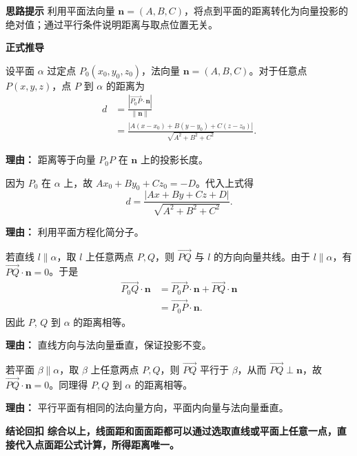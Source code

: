\begin{proofbox}
	\textbf{\textcolor{CProof}{思路提示}}
	利用平面法向量 $\mathbf{n}=(A,B,C)$，将点到平面的距离转化为向量投影的绝对值；通过平行条件说明距离与取点位置无关。

	\medskip
	\textbf{\textcolor{CProof}{正式推导}}
	\begin{description}[style=nextline, leftmargin=2.8em, labelsep=0.5em, itemsep=0.55em]
		\item[\textbf{步骤一（点面距公式推导）：}]
			设平面 $\alpha$ 过定点 $P_0(x_0,y_0,z_0)$，法向量 $\mathbf{n}=(A,B,C)$。对于任意点 $P(x,y,z)$，点 $P$ 到 $\alpha$ 的距离为
			\[
				\begin{aligned}
					d &= \frac{|\overrightarrow{P_0P}\cdot\mathbf{n}|}{\|\mathbf{n}\|} \\ &= \frac{|A(x-x_0)+B(y-y_0)+C(z-z_0)|}{\sqrt{A^2+B^2+C^2}}.
			\end{aligned}
			\]
			\par\textbf{理由：} 距离等于向量 $P_0P$ 在 $\mathbf{n}$ 上的投影长度。
		\item[\textbf{步骤二（代入平面方程）：}]
			因为 $P_0$ 在 $\alpha$ 上，故 $Ax_0+By_0+Cz_0=-D$。代入上式得
			\[
				d = \frac{|Ax+By+Cz+D|}{\sqrt{A^2+B^2+C^2}}.
			\]
			\par\textbf{理由：} 利用平面方程化简分子。
		\item[\textbf{步骤三（线面平行距离不变）：}]
			若直线 $l\parallel\alpha$，取 $l$ 上任意两点 $P,Q$，则 $\overrightarrow{PQ}$ 与 $l$ 的方向向量共线。由于 $l\parallel\alpha$，有 $\overrightarrow{PQ}\cdot\mathbf{n}=0$。于是
			\[
				\begin{aligned}
					\overrightarrow{P_0Q}\cdot\mathbf{n} &= \overrightarrow{P_0P}\cdot\mathbf{n} + \overrightarrow{PQ}\cdot\mathbf{n} \\ &= \overrightarrow{P_0P}\cdot\mathbf{n}.
			\end{aligned}
			\]
			因此 $P$, $Q$ 到 $\alpha$ 的距离相等。
			\par\textbf{理由：} 直线方向与法向量垂直，保证投影不变。
		\item[\textbf{步骤四（面面平行距离不变）：}]
			若平面 $\beta\parallel\alpha$，取 $\beta$ 上任意两点 $P,Q$，则 $\overrightarrow{PQ}$ 平行于 $\beta$，从而 $\overrightarrow{PQ}\perp\mathbf{n}$，故 $\overrightarrow{PQ}\cdot\mathbf{n}=0$。同理得 $P,Q$ 到 $\alpha$ 的距离相等。
			\par\textbf{理由：} 平行平面有相同的法向量方向，平面内向量与法向量垂直。
	\end{description}

	\medskip
	\textbf{\textcolor{CProof}{结论回扣}}
	\textbf{综合以上，线面距和面面距都可以通过选取直线或平面上任意一点，直接代入点面距公式计算，所得距离唯一。}
\end{proofbox}
